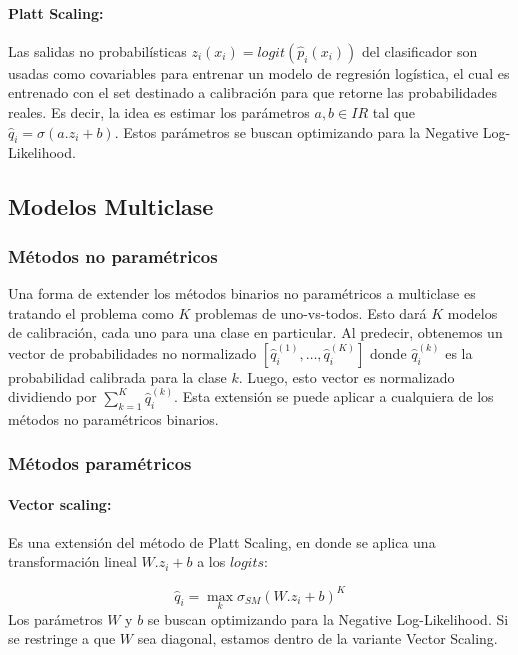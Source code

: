 \paragraph{Platt Scaling:}

Las salidas no probabilísticas $z_{i}(x_i) = logit(\hat p_{i}(x_i))$ del
clasificador son usadas como covariables para entrenar un modelo de regresión
logística, el cual es entrenado con el set destinado a calibración para que
retorne las probabilidades reales. Es decir, la idea es estimar los parámetros
$a, b \in I\!R$ tal que $\hat q_{i} = \sigma(a.z_i+b)$. Estos parámetros se
buscan optimizando para la Negative Log-Likelihood.

\subsection{Modelos Multiclase}

\subsubsection{Métodos no paramétricos}

Una forma de extender los métodos binarios no paramétricos a multiclase es
tratando el problema como $K$ problemas de uno-vs-todos. Esto dará $K$ modelos
de calibración, cada uno para una clase en particular. Al predecir, obtenemos un
vector de probabilidades no normalizado $[\hat q_{i}^{(1)}, \dots, \hat
q_{i}^{(K)}]$ donde $\hat q_{i}^{(k)}$ es la probabilidad calibrada para la
clase $k$. Luego, esto vector es normalizado dividiendo por  $\sum
_{k=1}^{K}\hat q_{i}^{(k)}$. Esta extensión se puede aplicar a cualquiera de los
métodos no paramétricos binarios.

\subsubsection{Métodos paramétricos}

\paragraph{Vector scaling:}

Es una extensión del método de Platt Scaling, en donde se aplica una
transformación lineal $W.z_i+b$ a los $logits$:

$$\displaystyle \hat q_{i}=\max_k \sigma_{SM}(W.z_i+b)^{K}$$ Los parámetros $W$
y $b$ se buscan optimizando para la Negative Log-Likelihood. Si se restringe a
que $W$ sea diagonal, estamos dentro de la variante Vector Scaling.

